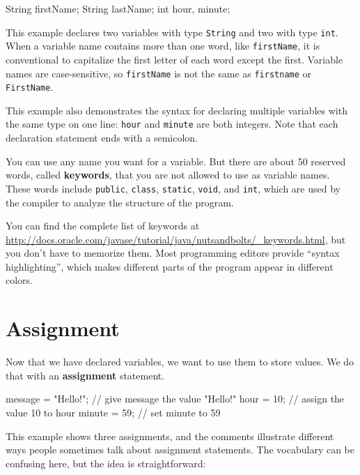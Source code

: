 \documentclass[12pt]{book}
\theoremstyle{exercise}
\newcommand{\java}[1]{\verb"#1"}
\begin{document}
\begin{code}
    String firstName;
    String lastName;
    int hour, minute;
\end{code}

This example declares two variables with type \java{String} and two with type \java{int}.
When a variable name contains more than one word, like \java{firstName}, it is conventional to capitalize the first letter of each word except the first.
Variable names are case-sensitive, so \java{firstName} is not the same as \java{firstname} or \java{FirstName}.

This example also demonstrates the syntax for declaring multiple variables with the same type on one line: \java{hour} and \java{minute} are both integers.
Note that each declaration statement ends with a semicolon.


You can use any name you want for a variable.
But there are about 50 reserved words, called {\bf keywords}, that you are not allowed to use as variable names.
These words include \java{public}, \java{class}, \java{static}, \java{void}, and \java{int}, which are used by the compiler to analyze the structure of the program.

You can find the complete list of keywords at \url{http://docs.oracle.com/javase/tutorial/java/nutsandbolts/_keywords.html}, but you don't have to memorize them.
Most programming editors provide ``syntax highlighting'', which makes different parts of the program appear in different colors.


\section{Assignment}


Now that we have declared variables, we want to use them to store values.
We do that with an {\bf assignment} statement.

\begin{code}
    message = "Hello!";  // give message the value "Hello!"
    hour = 10;           // assign the value 10 to hour
    minute = 59;         // set minute to 59
\end{code}

This example shows three assignments, and the comments illustrate different ways people sometimes talk about assignment statements.
The vocabulary can be confusing here, but the idea is straightforward:
\end{document}
